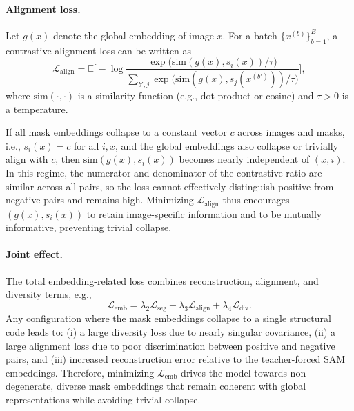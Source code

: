 \documentclass[12pt]{article}
\begin{document}
\paragraph{Alignment loss.}
Let \(g(x)\) denote the global embedding of image \(x\).
For a batch \(\{x^{(b)}\}_{b=1}^B\), a contrastive alignment loss can be
written as
\[
\mathcal{L}_{\mathrm{align}} =
\mathbb{E}\bigg[
- \log
\frac{\exp\big(\mathrm{sim}(g(x), s_i(x)) / \tau\big)}
{\sum_{b',j} \exp\big(\mathrm{sim}(g(x), s_j(x^{(b')})) / \tau\big)}
\bigg],
\]
where \(\mathrm{sim}(\cdot,\cdot)\) is a similarity function
(e.g., dot product or cosine) and \(\tau > 0\) is a temperature.

If all mask embeddings collapse to a constant vector \(c\) across images
and masks, i.e., \(s_i(x) = c\) for all \(i,x\), and the global embeddings
also collapse or trivially align with \(c\), then
\(\mathrm{sim}(g(x), s_i(x))\) becomes nearly independent of
\((x,i)\).
In this regime, the numerator and denominator of the contrastive ratio
are similar across all pairs, so the loss cannot effectively
distinguish positive from negative pairs and remains high.
Minimizing \(\mathcal{L}_{\mathrm{align}}\) thus encourages
\((g(x), s_i(x))\) to retain image-specific information and to be
mutually informative, preventing trivial collapse.

\paragraph{Joint effect.}
The total embedding-related loss combines reconstruction, alignment,
and diversity terms, e.g.,
\[
\mathcal{L}_{\mathrm{emb}}
= \lambda_2 \mathcal{L}_{\mathrm{seg}}
+ \lambda_3 \mathcal{L}_{\mathrm{align}}
+ \lambda_4 \mathcal{L}_{\mathrm{div}}.
\]
Any configuration where the mask embeddings collapse to a single
structural code leads to:
(i) a large diversity loss due to nearly singular covariance,
(ii) a large alignment loss due to poor discrimination between positive
and negative pairs, and
(iii) increased reconstruction error relative to the teacher-forced SAM
embeddings.
Therefore, minimizing \(\mathcal{L}_{\mathrm{emb}}\) drives the model
towards non-degenerate, diverse mask embeddings that remain coherent
with global representations while avoiding trivial collapse.
\end{document}
